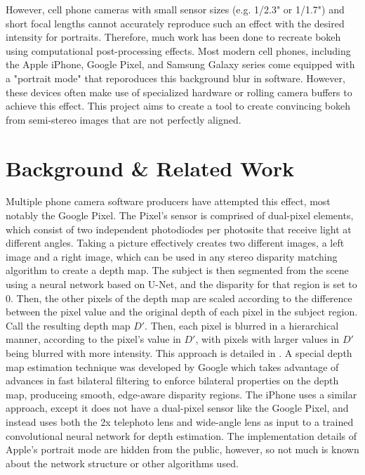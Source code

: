 \documentclass[10pt,twocolumn,letterpaper]{article}
\begin{document}
\par However, cell phone cameras with small sensor sizes (e.g. 1/2.3" or 1/1.7") and short focal lengths cannot accurately reproduce such an effect with the desired
intensity for portraits. Therefore, much work has been done to recreate bokeh using computational post-processing effects. Most modern cell phones, including the
Apple iPhone, Google Pixel, and Samsung Galaxy series come equipped with a "portrait mode" that reporoduces this background blur in software. However, these
devices often make use of specialized hardware or rolling camera buffers to achieve this effect. This project aims to create a tool to create convincing bokeh from semi-stereo
images that are not perfectly aligned.

\section{Background \& Related Work}
\par Multiple phone camera software producers have attempted this effect, most notably the Google Pixel. The Pixel's sensor is comprised of dual-pixel elements,
which consist of two independent photodiodes per photosite that receive light at different angles.
Taking a picture effectively creates two different images, a left image and a right image, which can be used in any stereo disparity matching algorithm to
create a depth map. The subject is then segmented from the scene using a neural network based on U-Net, and the disparity for that region is set to 0. Then,
the other pixels of the depth map are scaled according to the difference between the pixel value and the original depth of each pixel in the subject region.
Call the resulting depth map $D'$.
Then, each pixel is blurred in a hierarchical manner, according to the pixel's value in $D'$, with pixels with larger values in $D'$ being blurred with more
intensity. This approach is detailed in \cite{wadhwa_et_al_2018}. A special depth map estimation technique was developed by Google \cite{barron_adams_shih_hernandez_2015}
which takes advantage of advances in fast bilateral filtering to enforce bilateral properties on the depth map, produceing smooth, edge-aware disparity regions.
The iPhone uses a similar approach, except it does not have a dual-pixel sensor like the Google Pixel, and instead uses both the 2x telephoto lens and wide-angle lens
as input to a trained convolutional neural network for depth estimation. The implementation details of Apple's portrait mode are hidden from the public, however, so not
much is known about the network structure or other algorithms used.
\end{document}
